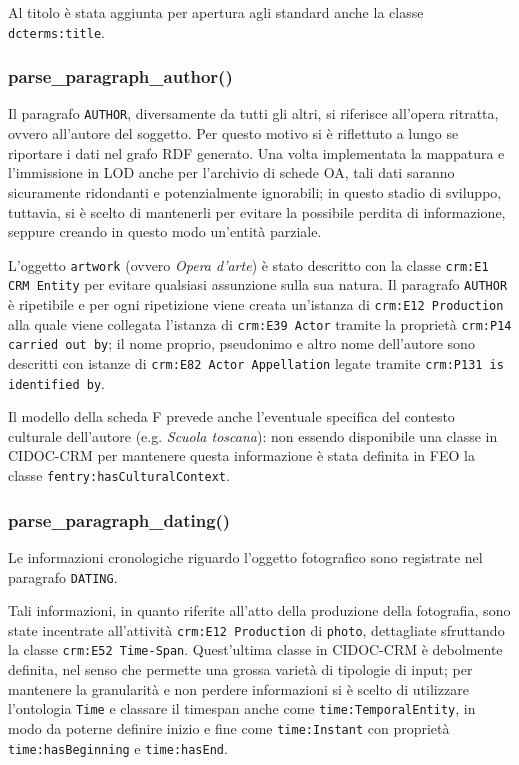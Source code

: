 Al titolo è stata aggiunta per apertura agli standard anche la classe \texttt{dcterms:title}.

\subsubsection{parse\_paragraph\_author()}\label{sec:parse-paragraph-author}
Il paragrafo \texttt{AUTHOR}, diversamente da tutti gli altri, si riferisce all'opera ritratta, ovvero all'autore del soggetto. Per questo motivo si è riflettuto a lungo se riportare i dati nel grafo RDF generato. Una volta implementata la mappatura e l'immissione in LOD anche per l'archivio di schede OA, tali dati saranno sicuramente ridondanti e potenzialmente ignorabili; in questo stadio di sviluppo, tuttavia, si è scelto di mantenerli per evitare la possibile perdita di informazione, seppure creando in questo modo un'entità parziale.

L'oggetto \texttt{artwork} (ovvero \emph{Opera d'arte}) è stato descritto con la classe \texttt{crm:E1 CRM Entity} per evitare qualsiasi assunzione sulla sua natura. Il paragrafo \texttt{AUTHOR} è ripetibile e per ogni ripetizione viene creata un'istanza di \texttt{crm:E12 Production} alla quale viene collegata l'istanza di \texttt{crm:E39 Actor} tramite la proprietà \texttt{crm:P14 carried out by}; il nome proprio, pseudonimo e altro nome dell'autore sono descritti con istanze di \texttt{crm:E82 Actor Appellation} legate tramite \texttt{crm:P131 is identified by}.

Il modello della scheda F prevede anche l'eventuale specifica del contesto culturale dell'autore (e.g. \emph{Scuola toscana}): non essendo disponibile una classe in CIDOC-CRM per mantenere questa informazione è stata definita in FEO la classe \texttt{fentry:hasCulturalContext}.

\subsubsection{parse\_paragraph\_dating()}
Le informazioni cronologiche riguardo l'oggetto fotografico sono registrate nel paragrafo \texttt{DATING}.

Tali informazioni, in quanto riferite all'atto della produzione della fotografia, sono state incentrate all'attività \texttt{crm:E12 Production} di \texttt{photo}, dettagliate sfruttando la classe \texttt{crm:E52 Time-Span}. Quest'ultima classe in CIDOC-CRM è debolmente definita, nel senso che permette una grossa varietà di tipologie di input; per mantenere la granularità e non perdere informazioni si è scelto di utilizzare l'ontologia \texttt{Time} e classare il timespan anche come \texttt{time:TemporalEntity}, in modo da poterne definire inizio e fine come \texttt{time:Instant} con proprietà \texttt{time:hasBeginning} e \texttt{time:hasEnd}.


